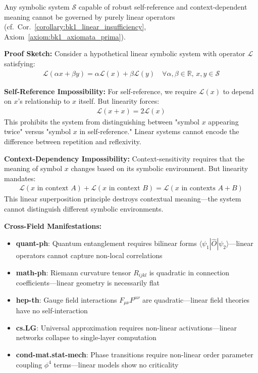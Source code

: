 \begin{theorem}
\label{theorem:bk1_reflexivity_quadratic}
Any symbolic system $\mathcal{S}$ capable of robust self-reference and context-dependent meaning cannot be governed by purely linear operators (cf.~Cor.~\ref{corollary:bk1_linear_insufficiency}, Axiom~\ref{axiom:bk1_axiomata_prima}).

\textbf{Proof Sketch:}
Consider a hypothetical linear symbolic system with operator $\mathcal{L}$ satisfying:
\begin{align}
\mathcal{L}(\alpha x + \beta y) = \alpha \mathcal{L}(x) + \beta \mathcal{L}(y) \quad \forall \alpha, \beta \in \mathbb{R}, \, x, y \in \mathcal{S}
\end{align}

\textbf{Self-Reference Impossibility:} For self-reference, we require $\mathcal{L}(x)$ to depend on $x$'s relationship to $x$ itself. But linearity forces:
\begin{align}
\mathcal{L}(x + x) = 2\mathcal{L}(x)
\end{align}
This prohibits the system from distinguishing between "symbol $x$ appearing twice" versus "symbol $x$ in self-reference." Linear systems cannot encode the difference between repetition and reflexivity.

\textbf{Context-Dependency Impossibility:} Context-sensitivity requires that the meaning of symbol $x$ changes based on its symbolic environment. But linearity mandates:
\begin{align}
\mathcal{L}(x \text{ in context } A) + \mathcal{L}(x \text{ in context } B) = \mathcal{L}(x \text{ in contexts } A + B)
\end{align}
This linear superposition principle destroys contextual meaning—the system cannot distinguish different symbolic environments.

\textbf{Cross-Field Manifestations:}
\begin{itemize}
\item \textbf{quant-ph}: Quantum entanglement requires bilinear forms $\langle \psi_1 | \hat{O} | \psi_2 \rangle$—linear operators cannot capture non-local correlations
\item \textbf{math-ph}: Riemann curvature tensor $R_{ijkl}$ is quadratic in connection coefficients—linear geometry is necessarily flat
\item \textbf{hep-th}: Gauge field interactions $F_{\mu\nu} F^{\mu\nu}$ are quadratic—linear field theories have no self-interaction
\item \textbf{cs.LG}: Universal approximation requires non-linear activations—linear networks collapse to single-layer computation
\item \textbf{cond-mat.stat-mech}: Phase transitions require non-linear order parameter coupling $\phi^4$ terms—linear models show no criticality
\end{itemize}
\end{theorem}

